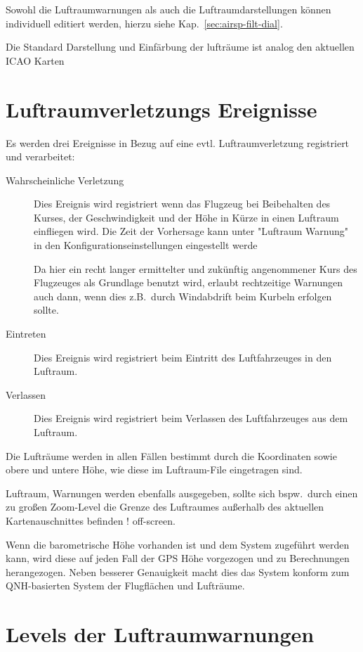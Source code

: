 Sowohl die Luftraumwarnungen als auch die Luftraumdarstellungen können individuell editiert werden,
hierzu siehe Kap.~\ref{sec:airsp-filt-dial}.

Die Standard Darstellung und Einfärbung der lufträume ist analog den aktuellen ICAO Karten

\section{Luftraumverletzungs Ereignisse}

Es werden drei Ereignisse in Bezug auf eine evtl. Luftraumverletzung  registriert und verarbeitet:
\begin{description}
\item[Wahrscheinliche Verletzung] Dies Ereignis wird registriert
wenn das Flugzeug bei Beibehalten des Kurses, der Geschwindigkeit und der Höhe in Kürze in einen Luftraum einfliegen wird.
Die Zeit der Vorhersage kann unter "Luftraum Warnung" in den Konfigurationseinstellungen eingestellt werde

Da hier ein recht langer ermittelter und zukünftig angenommener Kurs des Flugzeuges als
 Grundlage benutzt wird, erlaubt \xc rechtzeitige Warnungen auch dann, wenn dies z.B.\
 durch Windabdrift beim Kurbeln erfolgen sollte.
\item[Eintreten] Dies Ereignis wird registriert beim Eintritt des Luftfahrzeuges in den Luftraum.
\item[Verlassen] Dies Ereignis wird registriert beim Verlassen des Luftfahrzeuges aus dem Luftraum.
\end{description}
Die Lufträume werden in allen Fällen bestimmt durch die Koordinaten sowie obere und
untere Höhe, wie diese im Luftraum-File eingetragen sind.

Luftraum, Warnungen werden ebenfalls ausgegeben, sollte sich bspw.\ durch einen zu großen Zoom-Level
 die  Grenze des Luftraumes außerhalb des aktuellen Kartenauschnittes befinden !
off-screen.

Wenn die barometrische Höhe vorhanden ist und dem System zugeführt werden kann, wird diese auf
jeden Fall der GPS Höhe vorgezogen und zu Berechnungen herangezogen.
Neben besserer Genauigkeit macht dies das System konform zum QNH-basierten System der
Flugflächen und Lufträume.

\section{Levels der Luftraumwarnungen}\label{airspace-level}

